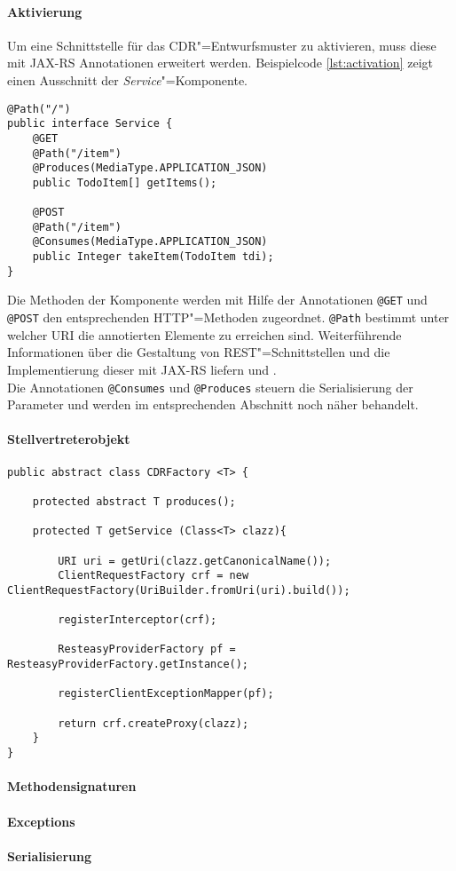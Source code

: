 \paragraph{Aktivierung}
Um eine Schnittstelle für das \ac{CDR}"=Entwurfsmuster zu aktivieren, muss diese mit \ac{JAX-RS} Annotationen erweitert werden. 
Beispielcode \ref{lst:activation} zeigt einen Ausschnitt der \textit{Service}"=Komponente.
\begin{lstlisting}[caption={Aktivierung},captionpos=b,label=lst:activation] 
@Path("/")
public interface Service {	
	@GET
	@Path("/item")
	@Produces(MediaType.APPLICATION_JSON)
	public TodoItem[] getItems();	

	@POST
	@Path("/item")
	@Consumes(MediaType.APPLICATION_JSON)
	public Integer takeItem(TodoItem tdi);	
}
\end{lstlisting}
Die Methoden der Komponente werden mit Hilfe der Annotationen \colorbox{mygray}{\lstinline!@GET!} und \colorbox{mygray}{\lstinline!@POST!} den entsprechenden \ac{HTTP}"=Methoden zugeordnet. \colorbox{mygray}{\lstinline!@Path!} bestimmt unter welcher \ac{URI} die annotierten Elemente zu erreichen sind. Weiterführende Informationen über die Gestaltung von \ac{REST}"=Schnittstellen und die Implementierung dieser mit \ac{JAX-RS} liefern \cite{Tilkov2011} und \cite{Burke2010}. \\
Die Annotationen \colorbox{mygray}{\lstinline!@Consumes!} und \colorbox{mygray}{\lstinline!@Produces!} steuern die Serialisierung der Parameter und werden im entsprechenden Abschnitt noch näher behandelt.
\newpage
\paragraph{Stellvertreterobjekt}
\begin{lstlisting}[caption={Factory},captionpos=b,label=lst:Factory] 
public abstract class CDRFactory <T> {	

	protected abstract T produces();

	protected T getService (Class<T> clazz){							
				
		URI uri = getUri(clazz.getCanonicalName());			
		ClientRequestFactory crf = new ClientRequestFactory(UriBuilder.fromUri(uri).build());	
		
		registerInterceptor(crf);	
		
		ResteasyProviderFactory pf = ResteasyProviderFactory.getInstance();
		
		registerClientExceptionMapper(pf);		

		return crf.createProxy(clazz);
	}
}
\end{lstlisting}
\paragraph{Methodensignaturen}
\paragraph{Exceptions}
\paragraph{Serialisierung}